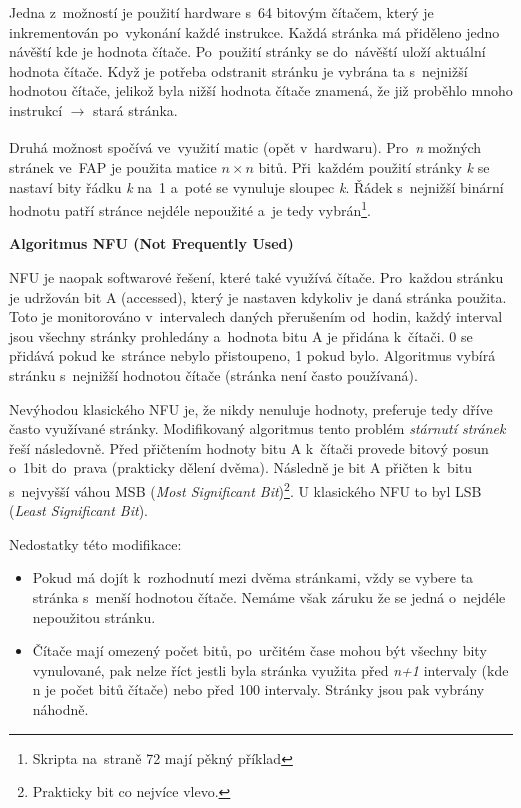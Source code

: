 \vspace{0,5cm}

Jedna z~možností je použití hardware s~64 bitovým čítačem, který je inkrementován po~vykonání každé instrukce. Každá stránka má přiděleno jedno návěští kde je hodnota čítače. Po~použití stránky se do~návěští uloží aktuální hodnota čítače. Když je potřeba odstranit stránku je vybrána ta s~nejnižší hodnotou čítače, jelikož byla nižší hodnota čítače znamená, že již proběhlo mnoho instrukcí $\xrightarrow[]{}$ stará stránka. 

\clearpage

Druhá možnost spočívá ve~využití matic (opět v~hardwaru). Pro~\emph{n} možných stránek ve~FAP je použita matice $n \times n$ bitů. Při~každém použití stránky \emph{k} se nastaví bity řádku \emph{k} na~1 a~poté se vynuluje sloupec \emph{k}. Řádek s~nejnižší binární hodnotu patří stránce nejdéle nepoužité a~je tedy vybrán\footnote{Skripta na~straně 72 mají pěkný příklad}. 

\begin{Large}
	\vspace{0,5cm}
	\textbf{Algoritmus NFU (Not Frequently Used)}
\end{Large}

NFU je naopak softwarové řešení, které také využívá čítače. Pro~každou stránku je udržován bit A (accessed), který je nastaven kdykoliv je daná stránka použita. Toto je monitorováno v~intervalech daných přerušením od~hodin, každý interval jsou všechny stránky prohledány a~hodnota bitu A je přidána k~čítači. 0 se přidává pokud ke~stránce nebylo přistoupeno, 1 pokud bylo. Algoritmus vybírá stránku s~nejnižší hodnotou čítače (stránka není často používaná). 

\vspace{0,5cm}

Nevýhodou klasického NFU je, že nikdy nenuluje hodnoty, preferuje tedy dříve často využívané stránky. Modifikovaný algoritmus tento problém \emph{stárnutí stránek} řeší následovně. Před přičtením hodnoty bitu A k~čítači provede bitový posun o~1bit do~prava (prakticky dělení dvěma). Následně je bit A přičten k~bitu s~nejvyšší váhou MSB (\emph{Most Significant Bit})\footnote{Prakticky bit co nejvíce vlevo.}. U klasického NFU to byl LSB (\emph{Least Significant Bit}). 

\vspace{0,5cm}

Nedostatky této modifikace:

\begin{itemize}
	\item Pokud má dojít k~rozhodnutí mezi dvěma stránkami, vždy se vybere ta stránka s~menší hodnotou čítače. Nemáme však záruku že se jedná o~nejdéle nepoužitou stránku. 
	\item Čítače mají omezený počet bitů, po~určitém čase mohou být všechny bity vynulované, pak nelze říct jestli byla stránka využita před \emph{n+1} intervaly (kde n je počet bitů čítače) nebo před 100 intervaly. Stránky jsou pak vybrány náhodně. 
\end{itemize} 

